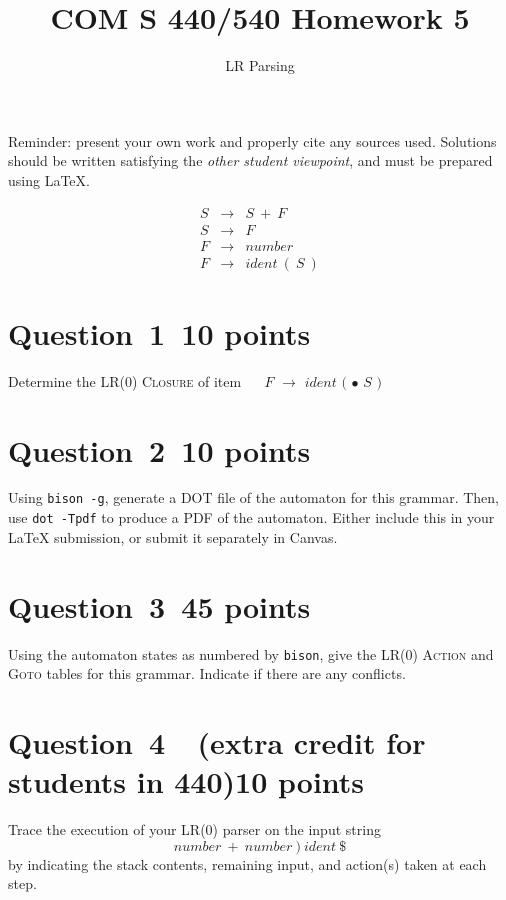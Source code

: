 \documentclass[10pt]{article}
\title{COM S 440/540 Homework 5}
\date{}
\author{LR Parsing}
\renewcommand{\thepage}{~}
\begin{document}
\maketitle

\noindent
Reminder: present your own work and properly cite any sources used.
Solutions should be written satisfying the \emph{other student viewpoint},
and must be prepared using \LaTeX.
\renewcommand{\thepage}{~}

\begin{eqnarray}
  S & \rightarrow & S ~+~ F
\\
  S & \rightarrow & F
\\
  F & \rightarrow & \mathit{number}
\\
  F & \rightarrow & \mathit{ident} ~(~ S ~)
\end{eqnarray}


\section*{Question~1~\hfill 10 points}

Determine the LR(0) \textsc{Closure} of item ~~
$F$ $\rightarrow$ $\mathit{ident}$ $($ $\bullet$ $S$ $)$

\section*{Question~2~\hfill 10 points}

Using {\tt bison -g}, generate a DOT file of the automaton
for this grammar.
Then, use {\tt dot -Tpdf} to produce a PDF of the automaton.
Either include this in your \LaTeX{} submission, or submit it separately
in Canvas.


\section*{Question~3~\hfill 45 points}

Using the automaton states as numbered by {\tt bison},
give the LR(0) \textsc{Action} and \textsc{Goto} tables
for this grammar.
Indicate if there are any conflicts.


\section*{Question~4~~(extra credit for students in 440)\hfill 10 points}

Trace the execution of your LR(0) parser on the input string
\[
\mathit{number} ~+~ \mathit{number} ~)~ \mathit{ident} ~\$
\]
by indicating the stack contents, remaining input, and
action(s) taken at each step.
\end{document}
